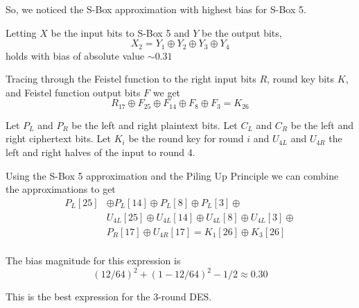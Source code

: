 \documentclass[9pt]{beamer}
\begin{document}
\begin{frame}
So, we noticed the S-Box approximation with highest bias for S-Box 5.

\vspace{5mm}
\pause Letting $X$ be the input bits to S-Box 5 and $Y$ be the output bits,
\[ X_{2} = Y_{1} \oplus Y_{2} \oplus Y_{3} \oplus Y_{4} \]
holds with bias of absolute value $\sim 0.31$

\vspace{5mm}
\pause Tracing through the Feistel function to the right input bits $R$, round key bits $K$, and Feistel function output bits $F$ we get
\[ R_{17} \oplus F_{25} \oplus F_{14} \oplus F_{8} \oplus F_{3} = K_{26} \]

\end{frame}

\begin{frame}
Let $P_L$ and $P_R$ be the left and right plaintext bits. Let $C_L$ and $C_R$ be the left and right ciphertext bits. Let $K_i$ be the round key for round $i$ and $U_{4L}$ and $U_{4R}$ the left and right halves of the input to round 4.

\vspace{5mm}
\pause Using the S-Box 5 approximation and the Piling Up Principle we can combine the approximations to get
\begin{align*}
 P_L[25] & \oplus P_L[14] \oplus P_L[8] \oplus P_L[3] \oplus \\
         & U_{4L}[25] \oplus U_{4L}[14] \oplus U_{4L}[8] \oplus U_{4L}[3] \oplus \\
			& P_R[17] \oplus U_{4R}[17] = K_1[26] \oplus K_3[26] \\
\end{align*}

\pause The bias magnitude for this expression is
\[ (12/64)^2 + (1 - 12/64)^2 - 1/2 \approx 0.30 \]

\pause This is the best expression for the 3-round DES.
\end{frame}
\end{document}
